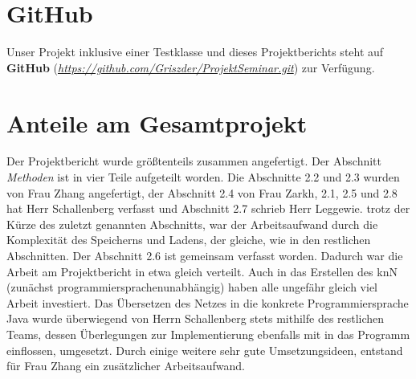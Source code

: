 \documentclass[paper=A4,pagesize=auto,12pt,headinclude=true,footinclude=true,BCOR=0mm,DIV=calc]{scrartcl}
\begin{document}
\section{GitHub}
Unser Projekt inklusive einer Testklasse und dieses Projektberichts steht auf \textbf{GitHub} (\hyperref{https://github.com/Griszder/ProjektSeminar.git}{}{}{\textit{https://github.com/Griszder/ProjektSeminar.git}}) zur Verfügung.

\vspace{1cm}

\section{Anteile am Gesamtprojekt}
Der Projektbericht wurde größtenteils zusammen angefertigt. Der Abschnitt \textit{Methoden} ist in vier Teile aufgeteilt worden. Die Abschnitte 2.2 und 2.3 wurden von Frau Zhang angefertigt, der Abschnitt 2.4 von Frau Zarkh, 2.1, 2.5 und 2.8 hat Herr Schallenberg verfasst und Abschnitt 2.7 schrieb Herr Leggewie. trotz der Kürze des zuletzt genannten Abschnitts, war der Arbeitsaufwand durch die Komplexität des Speicherns und Ladens, der gleiche, wie in den restlichen Abschnitten. Der Abschnitt 2.6 ist gemeinsam verfasst worden. Dadurch war die Arbeit am Projektbericht in etwa gleich verteilt. Auch in das Erstellen des knN (zunächst programmiersprachenunabhängig) haben alle ungefähr gleich viel Arbeit investiert. Das Übersetzen des Netzes in die konkrete Programmiersprache Java wurde überwiegend von Herrn Schallenberg stets mithilfe des restlichen Teams, dessen Überlegungen zur Implementierung ebenfalls mit in das Programm einflossen, umgesetzt. Durch einige weitere sehr gute Umsetzungsideen, entstand für Frau Zhang ein zusätzlicher Arbeitsaufwand.

\vspace{1cm}

\printbibliography[heading=bibnumbered]
\end{document}
